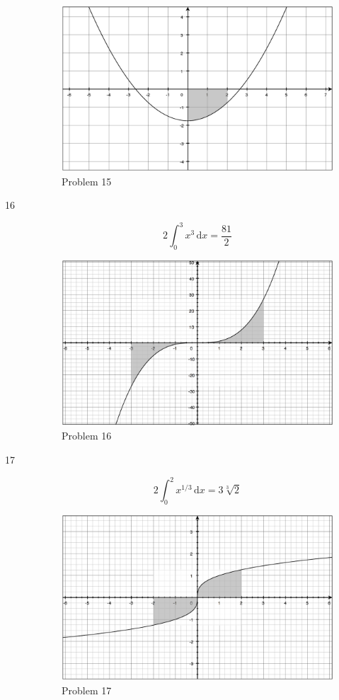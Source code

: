 \documentclass{exam}
\begin{document}
\begin{description}
\begin{figure}[H]
  \centering
  \includegraphics[scale=.3]{problem_15.eps}
  \caption*{Problem 15}
\end{figure}

\item[16]
\[
  2 \int_0^3 x^3 \, \mathrm{d}x = \frac{81}{2}
\] 

\begin{figure}[H]
  \centering
  \includegraphics[scale=.3]{problem_16.eps}
  \caption*{Problem 16}
\end{figure}

\item[17]
\[
  2 \int_0^2 x^{1/3} \, \mathrm{d}x = 3 \sqrt[3]{2}
\] 

\begin{figure}[H]
  \centering
  \includegraphics[scale=.3]{problem_17.eps}
  \caption*{Problem 17}
\end{figure}


\end{description}
\end{document}
